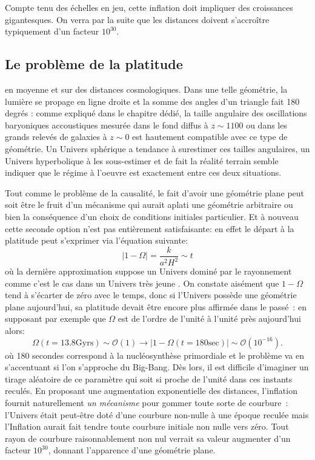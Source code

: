 Compte tenu des échelles en jeu, cette inflation doit impliquer des croissances gigantesques. On verra par la suite que les distances doivent s'accroître typiquement d'un facteur $10^{30}$.


\subsection{Le problème de la platitude}
 en moyenne et sur des distances cosmologiques. Dans une telle géométrie, la lumière se propage en ligne droite et la somme des angles d'un triangle fait 180 degrés : comme expliqué dans le chapitre dédié, la taille angulaire des oscillations baryoniques accoustiques mesurée dans le fond diffus à $z\sim1100$ ou dans les grands relevés de galaxies à $z\sim 0$ est hautement compatible avec ce type de géométrie. Un Univers sphérique a tendance à surestimer ces tailles angulaires, un Univers hyperbolique à les sous-estimer et de fait la réalité terrain semble indiquer que le régime à l'oeuvre est exactement entre ces deux situations.

Tout comme le problème de la causalité, le fait d'avoir une géométrie plane peut soit être le fruit d'un mécanisme qui aurait aplati une géométrie arbitraire ou bien la conséquence d'un choix de conditions initiales particulier. Et à nouveau cette seconde option n'est pas entièrement satisfaisante: en effet le départ à la platitude peut s'exprimer via l'équation suivante:
\begin{equation}
|1-\Omega|=\frac{k}{a^2 H^2}\sim t
\end{equation}
où la dernière approximation suppose un Univers dominé par le rayonnement comme c'est le cas dans un Univers très jeune . On constate aisément que $1-\Omega$ tend à s'écarter de zéro avec le temps, donc si l'Univers possède une géométrie plane aujourd'hui, sa platitude devait être encore plus affirmée dans le passé~: en supposant par exemple que $\Omega$ est de l'ordre de l'unité à l'unité près aujourd'hui alors:
\begin{equation}
\Omega (t=13.8 \mathrm{Gyrs}) \sim \mathcal{O} (1) \rightarrow |1-\Omega (t=180 \mathrm{sec})| \sim \mathcal{O} (10^{-16}).
\end{equation}
où 180 secondes correspond à la nucléosynthèse primordiale et le problème va en s'accentuant si l'on s'approche du Big-Bang.
Dès lors, il est difficile d'imaginer un tirage aléatoire de ce paramètre qui soit si proche de l'unité dans ces instants reculés. En proposant une augmentation exponentielle des distances, l'inflation fournit naturellement \textit{un mécanisme} pour gommer toute sorte de courbure~: l'Univers était peut-être doté d'une courbure non-nulle à une époque reculée mais l'Inflation aurait fait tendre toute courbure initiale non nulle vers zéro. Tout rayon de courbure raisonnablement non nul verrait sa valeur augmenter d'un facteur $10^{30}$, donnant l'apparence d'une géométrie plane.

